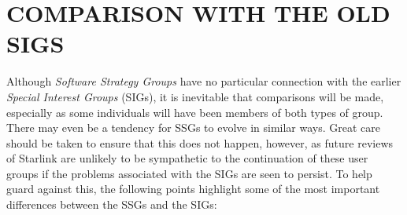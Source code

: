 \documentclass[11pt]{article}
\newcommand{\st}[1]{{\em{#1}}}
\begin{document}
\newpage
\appendix
\section{\label{sect:comparison}COMPARISON WITH THE OLD SIGS}

Although \st{Software Strategy Groups} have no particular connection
with the earlier \st{Special Interest Groups} (SIGs), it is inevitable
that comparisons will be made, especially as some individuals will
have been members of both types of group.  There may even be a
tendency for SSGs to evolve in similar ways. Great care should be
taken to ensure that this does not happen, however, as future reviews
of Starlink are unlikely to be sympathetic to the continuation of
these user groups if the problems associated with the SIGs are seen to
persist.  To help guard against this, the following points highlight
some of the most important differences between the SSGs and the SIGs:
\end{document}
